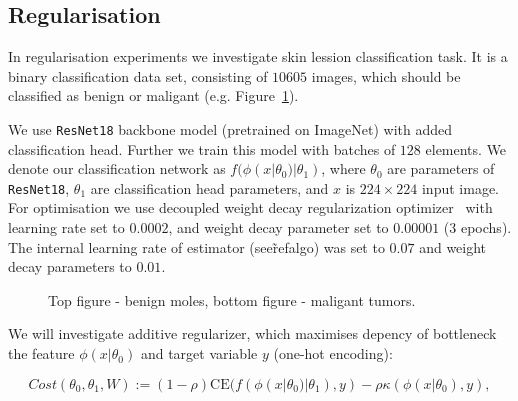 \documentclass{article}
\newcommand{\CE}{\mathrm{CE}}
\begin{document}
\subsection{Regularisation}
In regularisation experiments we investigate skin lession classification task. It is a binary classification data set, consisting of $10605$ images, which should be classified as benign or maligant (e.g. Figure~\ref{fig:Pneumonia_dataset_examples}).

We use \verb|ResNet18| backbone model (pretrained on ImageNet) with added classification head. Further we train this model with batches of $128$ elements.
We denote our classification network as $f(\phi(x|\theta_{0})|\theta_{1})$, where $\theta_{0}$ are parameters of \verb|ResNet18|, $\theta_{1}$ are classification head parameters, and $x$ is $224\times 224$ input image.
For optimisation we use decoupled weight decay regularization optimizer~\cite{Loshchilov2019DecoupledWD} with learning rate set to $0.0002$, and weight decay parameter set to $0.00001$ ($3$ epochs).
The internal learning rate of estimator (see\~ref{algo}) was set to $0.07$ and weight decay parameters to $0.01$.

\begin{figure}%
	\centering
	\qquad
	\caption{Top figure - benign moles, bottom figure - maligant tumors.}
	\label{fig:Pneumonia_dataset_examples}
\end{figure}


We will investigate additive regularizer, which maximises depency of bottleneck the feature $\phi(x|\theta_{0})$ and target variable $y$ (one-hot encoding): 


\begin{equation}
\label{eq:regularizer1}
Cost(\theta_{0},\theta_{1}, W) := (1-\rho)\CE(f(\phi(x|\theta_{0})|\theta_{1}),y) - \rho \kappa(\phi(x|\theta_{0}),y),
\end{equation}
\end{document}
